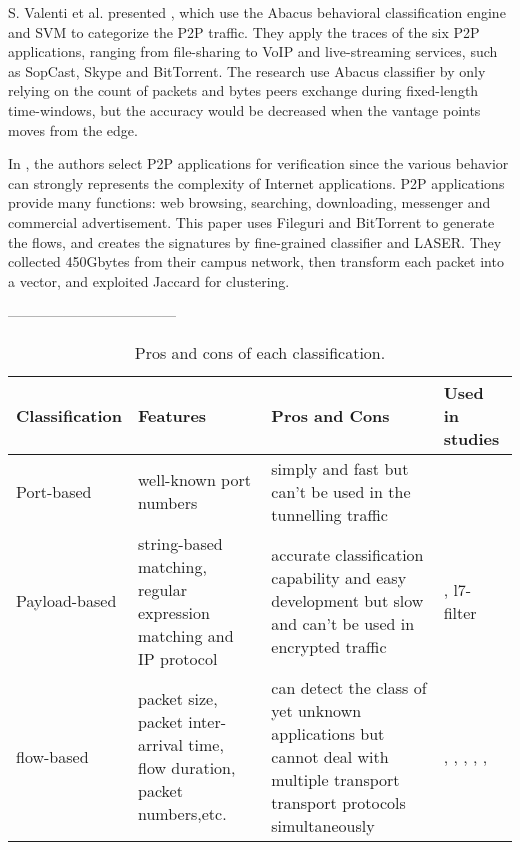 S. Valenti et al. presented \cite{FBC11}, which use the Abacus behavioral classification engine and SVM to categorize the P2P traffic. They apply the traces of the six P2P applications, ranging from file-sharing to VoIP and live-streaming services, such as SopCast, Skype and BitTorrent. The research use Abacus classifier by only relying on the count of packets and bytes peers exchange during fixed-length time-windows, but the accuracy would be decreased when the vantage points moves from the edge.

In \cite{TFT11}, the authors select P2P applications for verification since the various behavior can strongly represents the complexity of Internet applications. P2P applications provide many functions: web browsing, searching, downloading, messenger and commercial advertisement. This paper uses Fileguri and BitTorrent to generate the flows, and creates the signatures by fine-grained classifier and LASER. They collected 450Gbytes from their campus network, then transform each packet into a vector, and exploited Jaccard for clustering.


------------------------------------
\
\begin{table}[H]
\centering
\caption{Pros and cons of each classification.}
\begin{tabular}{|l|p{3.5cm}|p{3.5cm}|p{3.5cm}|}
\hline Classification & Features & Pros and Cons & Used in studies \\
\hline
\hline Port-based & well-known port numbers & simply and fast but can't be used in the tunnelling traffic & \cite{TTC}\\
\hline Payload-based &  string-based matching, regular expression matching and IP protocol & accurate classification capability and easy development but slow and can't be used in encrypted traffic & \cite{nDPI} , {l7-filter} \\
\hline flow-based & packet size, packet inter-arrival time, flow duration, packet numbers,etc. & can detect the class of yet unknown applications but cannot deal with multiple transport transport protocols simultaneously & \cite{EAI06}, \cite{ATC13}, \cite{AIS14}, \cite{CMF04}, \cite{COC12}, \cite{FPN13, RTC10, AIS14, ASA09, FTC09} \\
\hline 
\end{tabular}
\label{table:pros-cons}
\end{table}
